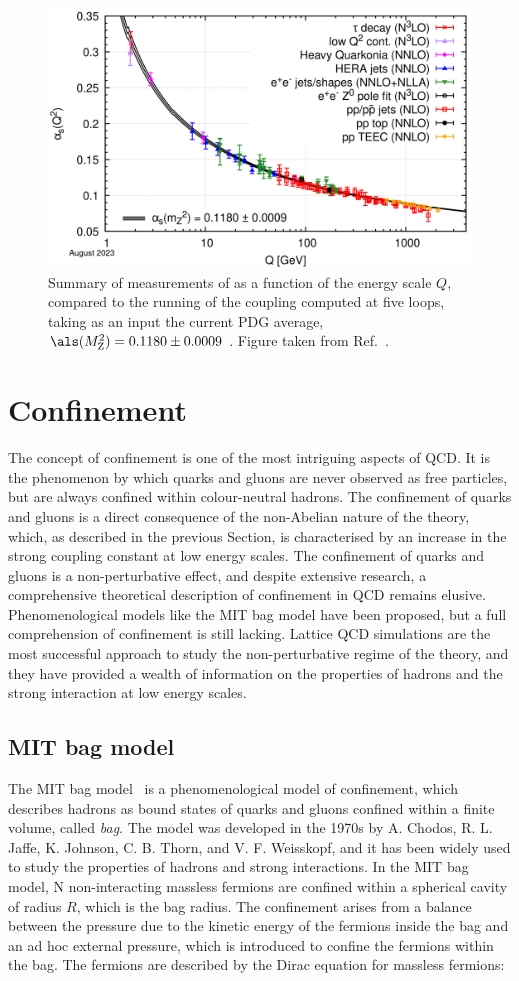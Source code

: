 \begin{figure}[htb]
    \centering
    \includegraphics[width=0.7\linewidth]{Figures/Chapter 1/Alpha_s_running.png}
    \caption{Summary of measurements of \als as a function of the energy scale $Q$, compared to the running of the coupling computed at five loops, taking as an input the current PDG average, $\als(M_\mathrm{Z}^2) = 0.1180 \pm 0.0009$ \gevcc. Figure taken from Ref.~\cite{pdg}.}
    \label{fig:alpha_s_running}
\end{figure}

\section{Confinement}
The concept of confinement is one of the most intriguing aspects of QCD. It is the phenomenon by which quarks and gluons are never observed as free particles, but are always confined within colour-neutral hadrons. The confinement of quarks and gluons is a direct consequence of the non-Abelian nature of the theory, which, as described in the previous Section, is characterised by an increase in the strong coupling constant at low energy scales. The confinement of quarks and gluons is a non-perturbative effect, and despite extensive research, a comprehensive theoretical description of confinement in QCD remains elusive. Phenomenological models like the MIT bag model have been proposed, but a full comprehension of confinement is still lacking. Lattice QCD simulations are the most successful approach to study the non-perturbative regime of the theory, and they have provided a wealth of information on the properties of hadrons and the strong interaction at low energy scales.

\subsection{MIT bag model}
The MIT bag model~\cite{Johnson:1975zp} is a phenomenological model of confinement, which describes hadrons as bound states of quarks and gluons confined within a finite volume, called \emph{bag}. The model was developed in the 1970s by A. Chodos, R. L. Jaffe, K. Johnson, C. B. Thorn, and V. F. Weisskopf, and it has been widely used to study the properties of hadrons and strong interactions. In the MIT bag model, N non-interacting massless fermions are confined within a spherical cavity of radius $R$, which is the bag radius. The confinement arises from a balance between the pressure due to the kinetic energy of the fermions inside the bag and an ad hoc external pressure, which is introduced to confine the fermions within the bag. The fermions are described by the Dirac equation for massless fermions:

